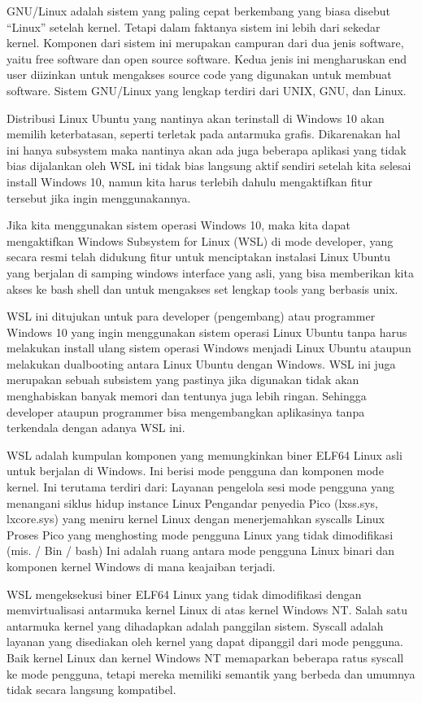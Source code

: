 \begin{enumeratae}
GNU/Linux adalah sistem yang paling cepat berkembang yang biasa disebut “Linux” setelah kernel. Tetapi dalam faktanya sistem ini lebih dari sekedar kernel. Komponen dari sistem ini merupakan campuran dari dua jenis software, yaitu free software dan open source software. Kedua jenis ini mengharuskan end user diizinkan untuk mengakses source code yang digunakan untuk membuat software. Sistem GNU/Linux yang lengkap terdiri dari UNIX, GNU, dan Linux.

Distribusi Linux Ubuntu yang nantinya akan terinstall di Windows 10 akan memilih keterbatasan, seperti terletak pada antarmuka grafis. Dikarenakan hal ini hanya subsystem maka nantinya akan ada juga beberapa aplikasi yang tidak bias dijalankan oleh WSL ini tidak bias langsung aktif sendiri setelah kita selesai install Windows 10, namun kita harus terlebih dahulu mengaktifkan fitur tersebut jika ingin menggunakannya.

Jika kita menggunakan sistem operasi Windows 10, maka kita dapat mengaktifkan Windows Subsystem for Linux (WSL) di mode developer, yang secara resmi telah didukung fitur untuk menciptakan instalasi Linux Ubuntu yang berjalan di samping windows interface yang asli, yang bisa memberikan kita akses ke bash shell dan untuk mengakses set lengkap tools yang berbasis unix.

WSL ini ditujukan untuk para developer (pengembang) atau programmer Windows 10 yang ingin menggunakan sistem operasi Linux Ubuntu tanpa harus melakukan install ulang sistem operasi Windows menjadi Linux Ubuntu ataupun melakukan dualbooting antara Linux Ubuntu dengan Windows. WSL ini juga merupakan sebuah subsistem yang pastinya jika digunakan tidak akan menghabiskan banyak memori dan tentunya juga lebih ringan. Sehingga developer ataupun programmer bisa mengembangkan aplikasinya tanpa terkendala dengan adanya WSL ini.

WSL adalah kumpulan komponen yang memungkinkan biner ELF64 Linux asli untuk berjalan di Windows. Ini berisi mode pengguna dan komponen mode kernel. Ini terutama terdiri dari:
Layanan pengelola sesi mode pengguna yang menangani siklus hidup instance Linux
Pengandar penyedia Pico (lxss.sys, lxcore.sys) yang meniru kernel Linux dengan menerjemahkan syscalls Linux
Proses Pico yang menghosting mode pengguna Linux yang tidak dimodifikasi (mis. / Bin / bash)
Ini adalah ruang antara mode pengguna Linux binari dan komponen kernel Windows di mana keajaiban terjadi.

WSL mengeksekusi biner ELF64 Linux yang tidak dimodifikasi dengan memvirtualisasi antarmuka kernel Linux di atas kernel Windows NT. Salah satu antarmuka kernel yang dihadapkan adalah panggilan sistem. Syscall adalah layanan yang disediakan oleh kernel yang dapat dipanggil dari mode pengguna. Baik kernel Linux dan kernel Windows NT memaparkan beberapa ratus syscall ke mode pengguna, tetapi mereka memiliki semantik yang berbeda dan umumnya tidak secara langsung kompatibel.


\end{enumeratae}
